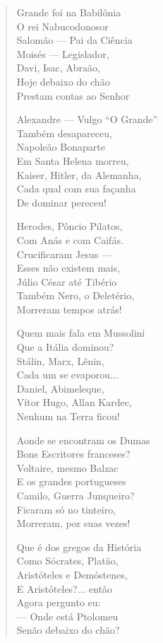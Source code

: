 \begin{verse}
Grande foi na Babilônia \\
O rei Nabucodonosor \\
Salomão ---  Pai da Ciência \\
Moisés ---  Legislador, \\
Davi, Isac, Abraão, \\
Hoje debaixo do chão \\
Prestam contas ao Senhor 

Alexandre ---  Vulgo ``O Grande'' \\
Também desapareceu, \\
Napoleão Bonaparte \\
Em Santa Helena morreu, \\
Kaiser, Hitler, da Alemanha, \\
Cada qual com sua façanha \\
De dominar pereceu! 

Herodes, Pôncio Pilatos, \\
Com Anás e com Caifás. \\
Crucificaram Jesus ---\\
Esses não existem mais, \\
Júlio César até Tibério \\
Também Nero, o Deletério, \\
Morreram tempos atrás! 


Quem mais fala em Mussolini \\
Que a Itália dominou? \\
Stálin, Marx, Lênin, \\
Cada um se evaporou... \\
Daniel, Abimeleque, \\
Vítor Hugo, Allan Kardec, \\
Nenhum na Terra ficou! 

Aonde se encontram os Dumas \\
Bons Escritores franceses? \\
Voltaire, mesmo Balzac \\
E os grandes portugueses \\
Camilo, Guerra Junqueiro? \\
Ficaram só no tinteiro, \\
Morreram, por suas vezes! 

Que é dos gregos da História \\
Como Sócrates, Platão, \\
Aristóteles e Demóstenes,\\
E Aristóteles?... então \\
Agora pergunto eu: \\
---  Onde está Ptolomeu \\
Senão debaixo do chão? 


\end{verse}
